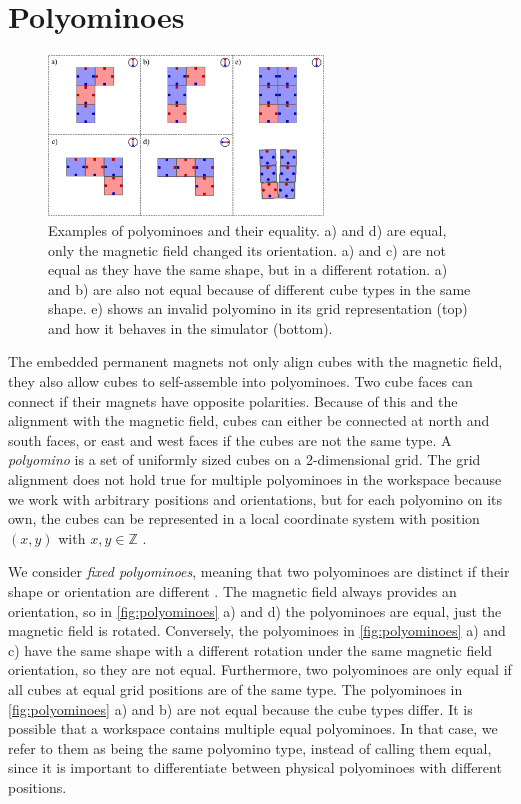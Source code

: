 \section{Polyominoes}
\label{sec:polys}

\begin{figure}
	\centering
	\includegraphics[width=0.65\textwidth]{figures/polyominoes.pdf}
	\caption[Examples of polyominoes and their equality]{Examples of polyominoes and their equality. a) and d) are equal, only the magnetic field changed its orientation. a) and c) are not equal as they have the same shape, but in a different rotation. a) and b) are also not equal because of different cube types in the same shape. e) shows an invalid polyomino in its grid representation (top) and how it behaves in the simulator (bottom).}
	\label{fig:polyominoes}
\end{figure}

The embedded permanent magnets not only align cubes with the magnetic field, they also allow cubes to self-assemble into polyominoes.
Two cube faces can connect if their magnets have opposite polarities.
Because of this and the alignment with the magnetic field, cubes can either be connected at north and south faces, or east and west faces if the cubes are not the same type.
A \textit{polyomino} is a set of uniformly sized cubes on a 2-dimensional grid.
The grid alignment does not hold true for multiple polyominoes in the workspace because we work with arbitrary positions and orientations, but for each polyomino on its own, the cubes can be represented in a local coordinate system with position $(x,y)$ with $x,y \in \mathbb{Z}$ \cite{Lu2021}.

We consider \textit{fixed polyominoes}, meaning that two polyominoes are distinct if their shape or orientation are different \cite{Lu2021}.
The magnetic field always provides an orientation, so in \autoref{fig:polyominoes} a) and d) the polyominoes are equal, just the magnetic field is rotated.
Conversely, the polyominoes in \autoref{fig:polyominoes} a) and c) have the same shape with a different rotation under the same magnetic field orientation, so they are not equal.
Furthermore, two polyominoes are only equal if all cubes at equal grid positions are of the same type.
The polyominoes in \autoref{fig:polyominoes} a) and b) are not equal because the cube types differ.
It is possible that a workspace contains multiple equal polyominoes.
In that case, we refer to them as being the same polyomino type, instead of calling them equal, since it is important to differentiate between physical polyominoes with different positions.

